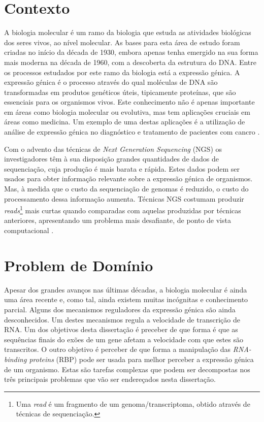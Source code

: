 \documentclass[9pt,a4paper]{extarticle}
\begin{document}
\begin{multicols}{2}

\section{Contexto} \label{sec:context}

A biologia molecular é um ramo da biologia que estuda as atividades biológicas
dos seres vivos, ao nível molecular. As bases para esta área de estudo foram
criadas no início da década de 1930, embora apenas tenha emergido na sua forma
mais moderna na década de 1960, com a descoberta da estrutura do DNA. Entre os
processos estudados por este ramo da biologia está a expressão génica. A
expressão génica é o processo através do qual moléculas de DNA são
transformadas em produtos genéticos úteis, tipicamente proteínas, que são
essenciais para os organismos vivos. Este conhecimento não é apenas importante
em áreas como biologia molecular ou evolutiva, mas tem aplicações cruciais em
áreas como medicina. Um exemplo de uma destas aplicações é a utilização de
análise de expressão génica no diagnóstico e tratamento de pacientes com cancro
\cite{Pusztai01062003}.

Com o advento das técnicas de \textit{Next Generation Sequencing} (NGS) os
investigadores têm à sua disposição grandes quantidades de dados de
sequenciação, cuja produção é mais barata e rápida. Estes dados podem ser usados
para obter informação relevante sobre a expressão génica de organismos. Mas, à
medida que o custo da sequenciação de genomas é reduzido, o custo do
processamento dessa informação aumenta. Técnicas NGS costumam produzir
\emph{reads}\footnote{Uma \emph{read} é um fragmento de um genoma/transcriptoma,
obtido através de técnicas de sequenciação.} mais curtas quando comparadas com
aquelas produzidas por técnicas anteriores, apresentando um problema mais
desafiante, de ponto de vista computacional \cite{Wolf2013}.

\section{Problem de Domínio} \label{sec:problem}

Apesar dos grandes avanços nas últimas décadas, a biologia molecular é ainda uma
área recente e, como tal, ainda existem muitas incógnitas e conhecimento
parcial. Alguns dos mecanismos reguladores da expressão génica são ainda
desconhecidos. Um destes mecanismos regula a velocidade de transcrição de RNA.
Um dos objetivos desta dissertação é preceber de que forma é que as sequências
finais do exões de um gene afetam a velocidade com que estes são transcritos. O
outro objetivo é perceber de que forma a manipulação das \emph{RNA-binding
proteins} (RBP) pode ser usada para melhor perceber a expressão génica de um
organismo. Estas são tarefas complexas que podem ser decompostas nos três
principais problemas que vão ser endereçados nesta dissertação.


\end{multicols}
\end{document}
